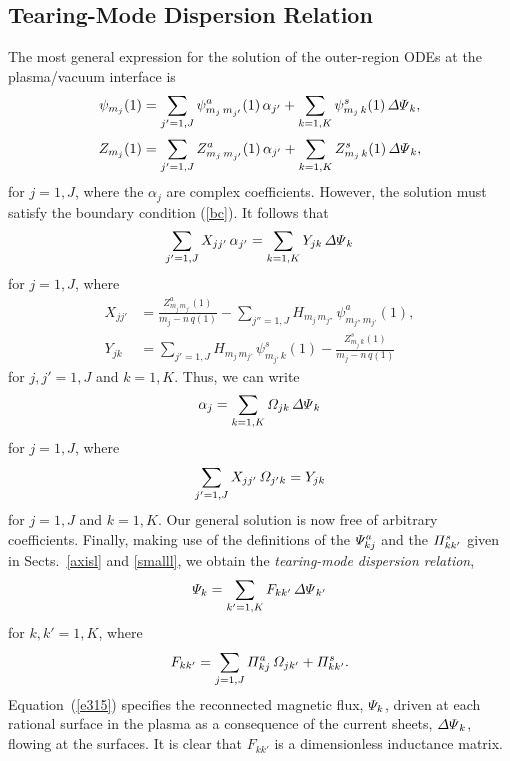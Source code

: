 \documentclass[12pt,prb,aps]{revtex4-1}
\begin{document}
\subsection{Tearing-Mode Dispersion Relation}\label{disp}
The most general expression for the solution of the outer-region ODEs at the plasma/vacuum interface is
\begin{align}\label{e385}
\psi_{m_j}(1) &= \sum_{j'=1,J}\psi_{m_j\,m_{j'}}^a(1)\,\alpha_{j'} + \sum_{k=1,K}\psi_{m_j\,k}^s(1)\,{\mit\Delta\Psi}_k,\\[0.5ex]
Z_{m_j}(1) &= \sum_{j'=1,J}Z_{m_j\,m_{j'}}^a(1)\,\alpha_{j'} + \sum_{k=1,K}Z_{m_j\,k}^s(1)\,{\mit\Delta\Psi}_k,\label{e386}
\end{align}
for $j=1,J$, where the $\alpha_j$ are complex coefficients. However,  the solution must satisfy the boundary condition (\ref{bc}). 
It follows that
\begin{equation}
\sum_{j'=1,J}X_{jj'}\,\alpha_{j'} = \sum_{k=1,K}Y_{jk}\,{\mit\Delta\Psi}_k
\end{equation}
for $j=1,J$, where
\begin{align}
X_{jj'} &=\frac{Z_{m_j\,m_{j'}}^{a}(1)}{m_j-n\,q(1)}-\sum_{j''=1,J}H_{m_j\,m_{j''}}\,\psi_{m_{j''}\,m_{j'}}^a(1),\\[0.5ex]
Y_{jk} &= \sum_{j'=1,J}H_{m_j\,m_{j'}}\,\psi_{m_{j'}\,k}^{s}(1)-
\frac{Z_{m_j\,k}^s(1)}{m_j-n\,q(1)}
\end{align}
for $j,j'=1,J$ and $k=1,K$. Thus, we can write
\begin{equation}
\alpha_j = \sum_{k=1,K}{\mit\Omega}_{jk}\,{\mit\Delta\Psi}_k
\end{equation}
for $j=1,J$, 
where
\begin{equation}
\sum_{j'=1,J}X_{jj'}\,{\mit\Omega}_{j'k} = Y_{jk}
\end{equation}
for $j=1,J$ and $k=1,K$. Our general solution is now free of arbitrary coefficients.
 Finally, making use of the definitions of the ${\mit\Psi}_{kj}^a$ and the ${\mit\Pi}_{kk'}^s$ given in Sects.~\ref{axisl} and \ref{smalll}, we obtain the {\em tearing-mode dispersion relation},\cite{connor,cht,am1,pletz}
\begin{equation}\label{e315}
{\mit\Psi}_k = \sum_{k'=1,K}F_{kk'}\,{\mit\Delta\Psi}_{k'}
\end{equation}
for $k,k'=1,K$, where
\begin{equation}
F_{kk'}=\sum_{j=1,J}{\mit\Pi}^a_{kj}\,{\mit\Omega}_{jk'} + {\mit\Pi}^s_{kk'}.
\end{equation}
Equation~(\ref{e315}) specifies the reconnected magnetic flux, ${\mit\Psi}_k$, driven at each rational surface in the plasma
as a consequence of the current sheets, ${\mit\Delta\Psi}_k$, flowing at the surfaces. It is clear that $F_{kk'}$ is a dimensionless
inductance matrix.\cite{rfbook}
\end{document}
